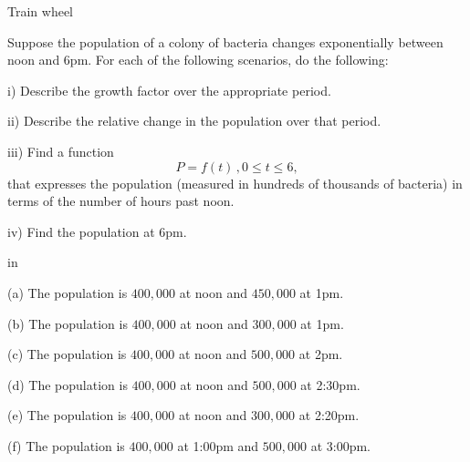\documentclass{ximera}
\newcommand{\pskip}{\vskip 0.1 in}
\begin{document}
\begin{exploration}
Train wheel
 
\begin{onlineOnly}
    \begin{center}
\end{center}
\end{onlineOnly}
\end{exploration}




\begin{example}
Suppose the population of a colony of bacteria changes exponentially between noon and 6pm. For each of the following scenarios, do the following:

i) Describe the growth factor over the appropriate period.

ii) Describe the relative change in the population over that period.

iii) Find a function
\[
       P = f(t) \, , 0\leq t \leq 6 ,
\]
that expresses the population (measured in hundreds of thousands of bacteria) in terms of the number of hours past noon.

iv) Find the population at 6pm.

\pskip

(a) The population is $400,000$ at noon and $450,000$ at 1pm.

(b) The population is $400,000$ at noon and $300,000$ at 1pm.

(c) The population is $400,000$ at noon and $500,000$ at 2pm.

(d) The population is $400,000$ at noon and $500,000$ at 2:30pm.

(e)  The population is $400,000$ at noon and $300,000$ at 2:20pm.

(f)  The population is $400,000$ at 1:00pm and $500,000$ at 3:00pm.

\end{example}
\end{document}
